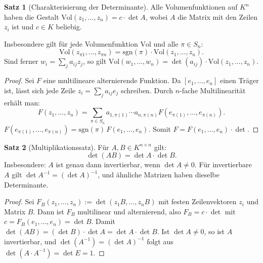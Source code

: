﻿\documentclass[a4paper,12pt]{report}
\theoremstyle{definition}
\newtheorem{satz}{Satz}
\begin{document}
\begin{satz}[Charakterisierung der Determinante]
    Alle Volumenfunktionen auf $K^n$ haben die Gestalt
    $\mathrm{Vol}(z_1, \dots, z_n) = c \cdot \det A$, wobei $A$ die Matrix
    mit den Zeilen $z_i$ ist und $c \in K$ beliebig.

    Insbesondere gilt für jede Volumenfunktion $\mathrm{Vol}$ und alle
    $\pi \in S_n$:
    \[
        \mathrm{Vol}(z_{\pi 1}, \dots, z_{\pi n})
        = \mathrm{sgn}(\pi) \cdot \mathrm{Vol}(z_1, \dots, z_n).
    \]
    Sind ferner $w_i = \sum_j a_{ij} z_j$, so gilt
    $\mathrm{Vol}(w_1, \dots, w_n) = \det(a_{ij}) \cdot \mathrm{Vol}(z_1, \dots, z_n)$.
\end{satz}
\begin{proof}
    Sei $F$ eine multilineare alternierende Funktion. Da $[e_1, \ldots, e_n]$ einen Träger ist,
    lässt sich jede Zeile $z_i = \sum_j a_{ij} e_j$ schreiben. Durch $n$-fache
    Multilinearität erhält man:
    \[
        F(z_1, \ldots, z_n) = \sum_{\pi \in S_n} a_{1,\pi(1)} \cdots a_{n,\pi(n)}
        F(e_{\pi(1)}, \ldots, e_{\pi(n)}).
    \]
    $F(e_{\pi(1)}, \ldots, e_{\pi(n)})
    = \mathrm{sgn}(\pi)\, F(e_1, \ldots, e_n)$.
    Somit $F = F(e_1,\ldots,e_n) \cdot \det$.
\end{proof}

\begin{satz}[Multiplikationssatz]
    Für $A, B \in K^{n \times n}$ gilt:
    \[
        \det(AB) = \det A \cdot \det B.
    \]
    Insbesondere: $A$ ist genau dann invertierbar, wenn $\det A \neq 0$.
    Für invertierbare $A$ gilt $\det A^{-1} = (\det A)^{-1}$,
    und ähnliche Matrizen haben dieselbe Determinante.
\end{satz}
\begin{proof}
    Sei $F_B(z_1, \ldots, z_n) := \det(z_1 B, \ldots, z_n B)$ mit festen Zeilenvektoren
    $z_i$ und Matrix $B$. Dann ist $F_B$ multilinear und alternierend, also
    $F_B = c \cdot \det$ mit $c = F_B(e_1, \ldots, e_n) = \det B$.
    Damit $\det(AB) = (\det B) \cdot \det A = \det A \cdot \det B$.
    Ist $\det A \neq 0$, so ist $A$ invertierbar, und $\det(A^{-1}) = (\det A)^{-1}$
    folgt aus $\det(A \cdot A^{-1}) = \det E = 1$.
\end{proof}
\end{document}
